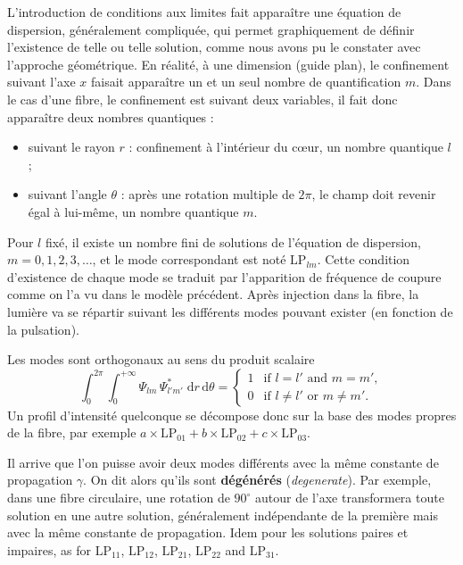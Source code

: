 L'introduction de conditions aux limites fait apparaître une équation de
dispersion, généralement compliquée, qui permet graphiquement de définir
l'existence de telle ou telle solution, comme nous avons pu le constater avec
l'approche géométrique. En réalité, à une dimension (guide plan), le
confinement suivant l'axe $x$ faisait apparaître un et un seul nombre de
quantification $m$. Dans le cas d'une fibre, le confinement est suivant deux
variables, il fait donc apparaître deux nombres quantiques :
\begin{itemize}
  \item suivant le rayon $r$ : confinement à l'intérieur du cœur, un nombre
    quantique $l$ ;
  \item suivant l'angle $\theta$ : après une rotation multiple de $2\pi$, le
    champ doit revenir égal à lui-même, un nombre quantique $m$.
\end{itemize}
Pour $l$ fixé, il existe un nombre fini de solutions de l'équation de
dispersion, $m = 0,1,2,3,\dots$, et le mode correspondant est noté
$\mathrm{LP}_{lm}$. Cette condition d'existence de chaque mode se traduit par
l'apparition de fréquence de coupure comme on l'a vu dans le modèle précédent.
Après injection dans la fibre, la lumière va se répartir suivant les
différents modes pouvant exister (en fonction de la pulsation).

\begin{prop}
  Les modes sont orthogonaux au sens du produit scalaire
  \begin{equation*}
    \int_0^{2\pi}\!\!\int_0^{+\infty}
      \Psi_{lm}\,\Psi^{*}_{l'm'}\;\mathrm{d}r\,\mathrm{d}\theta
    = \begin{cases}
        1 & \text{if } l = l' \text{ and } m = m',\\
        0 & \text{if } l \neq l' \text{ or } m \neq m'.
      \end{cases}
  \end{equation*}
  Un profil d'intensité quelconque se décompose donc sur la base des modes
  propres de la fibre, par exemple
  $a\times \mathrm{LP}_{01} + b\times \mathrm{LP}_{02}
  + c\times \mathrm{LP}_{03}$.
\end{prop}

\begin{remark}
  Il arrive que l'on puisse avoir deux modes différents avec la même constante
  de propagation $\gamma$. On dit alors qu'ils sont \textbf{dégénérés}
  (\textit{degenerate}). Par exemple, dans une fibre circulaire, une rotation
  de $90^\circ$ autour de l'axe transformera toute solution en une autre
  solution, généralement indépendante de la première mais avec la même
  constante de propagation. Idem pour les solutions paires et impaires, as
  for $\mathrm{LP}_{11}$, $\mathrm{LP}_{12}$, $\mathrm{LP}_{21}$,
  $\mathrm{LP}_{22}$ and $\mathrm{LP}_{31}$.
\end{remark}

